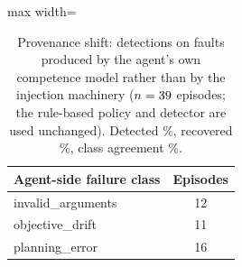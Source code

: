 \begin{table}[t]
\centering\small
\caption{Provenance shift: detections on faults produced by the agent's own
competence model rather than by the injection machinery ($n=39$ episodes;
the rule-based policy and detector are used unchanged). Detected
\NaturalDetected\%, recovered \NaturalRecovery\%, class agreement
\NaturalAgreement\%.}
\label{tab:natural}
\begin{adjustbox}{max width=\textwidth}
\begin{tabular}{@{}lc@{}}
\toprule
Agent-side failure class & Episodes \\
\midrule
invalid\_arguments & 12 \\
objective\_drift & 11 \\
planning\_error & 16 \\
\bottomrule
\end{tabular}
\end{adjustbox}
\end{table}
